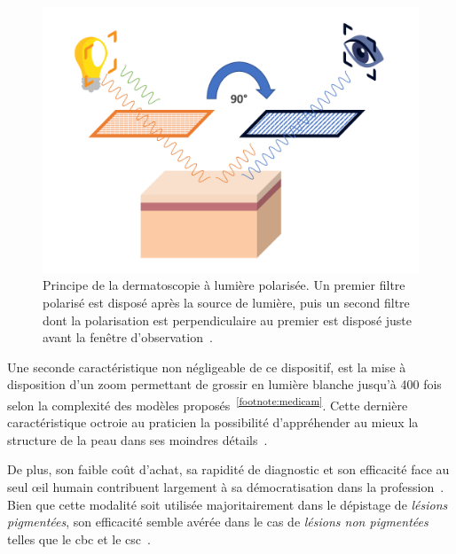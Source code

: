 \begin{figure}[H]
\centering
    \includegraphics[width=0.85\linewidth]{contents/chapter_2/resources/scheme_polarized_dermoscopy.pdf}
    \caption{Principe de la dermatoscopie à lumière polarisée. Un premier filtre polarisé est disposé après la source de lumière, puis un second filtre dont la polarisation est perpendiculaire au premier est disposé juste avant la fenêtre d'observation~\cite{sonthalia2019}.}
    \label{fig:scheme_polarized_dermoscopy}
\end{figure}\par

Une seconde caractéristique non négligeable de ce dispositif, est la mise à disposition d’un zoom permettant de grossir en lumière blanche jusqu'à 400 fois selon la complexité des modèles proposés~\textsuperscript{\ref{footnote:medicam}}. Cette dernière caractéristique octroie au praticien la possibilité d’appréhender au mieux la structure de la peau dans ses moindres détails~\cite{CamposdoCarmo2008}.\par

\addtocounter{footnote}{1}

De plus, son faible coût d’achat, sa rapidité de diagnostic et son efficacité face au seul œil humain contribuent largement à sa démocratisation dans la profession~\cite{Lallas2013}. Bien que cette modalité soit utilisée majoritairement dans le dépistage de \textit{lésions pigmentées}, son efficacité semble avérée dans le cas de \textit{lésions non pigmentées} telles que le \gls{cbc} et le \gls{csc}~\cite{Lallas2013}.\par

